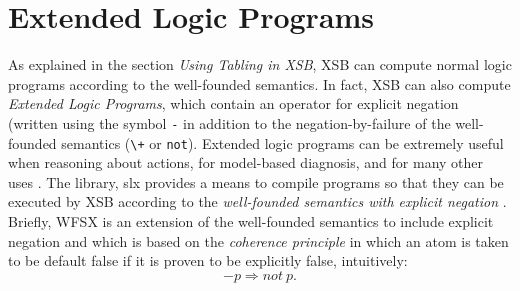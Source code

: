 \section{Extended Logic Programs}  \label{library_utilities:wfsx}
As explained in the section {\it Using Tabling in XSB}, XSB can
compute normal logic programs according to the well-founded semantics.
In fact, XSB 
can also compute {\em Extended Logic Programs}, which contain an
operator for explicit negation (written using the symbol {\tt -} in
addition to the negation-by-failure of the well-founded semantics
(\verb|\+| or {\tt not}).  Extended logic programs can be extremely
useful when reasoning about actions, for model-based diagnosis, and
for many other uses \cite{AlPe95}.  The library, {\sf slx} provides a means
to compile programs so that they can be executed by XSB according to
the {\em well-founded semantics with explicit negation} \cite{ADP95}.
Briefly, WFSX is an extension of the well-founded semantics to include
explicit negation and which is based on the {\em coherence principle}
in which an atom is taken to be default false if it is proven to be
explicitly false, intuitively:
\[
-p \Rightarrow not\ p.
\]

